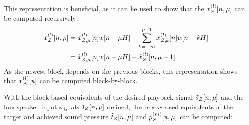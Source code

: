 This representation is beneficial, as it can be used to show that the $\tilde{x}^{(l)}_{\mathcal{Z}}[n, \mu]$ can be computed recursively:
\begin{align}
    \tilde{x}^{(l)}_{\mathcal{Z}}[n, \mu] &= \tilde{x}^{(l)}_{\mathcal{Z},\mu}[n]w[n - \mu H] +
                               \sum_{k=-\infty}^{\mu - 1} \tilde{x}^{(l)}_{\mathcal{Z},k}[n]w[n - kH] \\
                           &=  \tilde{x}^{(l)}_{\mathcal{Z},\mu}[n]w[n - \mu H] + \tilde{x}^{(l)}_{\mathcal{Z}}[n, \mu - 1]
\end{align}
As the newest block depends on the previous blocks, this representation shows that $x^{(l)}_{\mathcal{Z}}[n]$ can be computed block-by-block.

With the block-based equivalents of the desired playback signal $\tilde{s}_{\mathcal{Z}}[n, \mu]$ and the loudspeaker input signals $\tilde{s}_{\mathcal{Z}}[n, \mu]$ defined,
the block-based equivalents of the target and achieved sound pressure $\tilde{t}_{\mathcal{Z}}[n, \mu]$ and $\tilde{p}^{(m)}_{\mathcal{Z}}[n, \mu]$ can be computed: 

